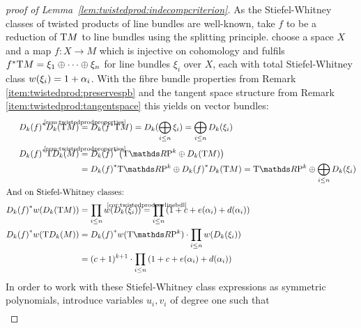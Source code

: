   \begin{proof}[proof of Lemma~\ref{lem:twistedprod:indecompcriterion}]
    As the Stiefel-Whitney classes of twisted products of line bundles
    are well-known, take $f$ to be a reduction of $\mathrm{T}M$ to line bundles
    using the splitting principle.
    \Idest choose a space $X$ and a map $f\colon X\to M$ which is
    injective on cohomology and fulfils
    ${f}^* \mathrm{T}M = \xi_1\oplus\dotsb\oplus\xi_n$ for line bundles
    $\xi_i$ over $X$, each with total Stiefel-Whitney class
    ${w}(\xi_i)=1+\alpha_i$.
    With the fibre bundle properties from
    Remark~%
    \ref{item:twistedprod:preservespb}
    and the tangent space structure from
    Remark~%
    \ref{item:twistedprod:tangentspace}
    this yields on vector bundles:
    \begin{align*}
      \pb{\Twistedprod{k}{f}} \Twistedprod{k}{\T M}
      &\cequalsby{\ref{rem:twistedprodproperties}}
        \Twistedprod{k}{\pb f \T M}
        = \Twistedprod{k}{\bigoplus_{i\leq n}\xi_i}
        = \bigoplus_{i\leq n}\Twistedprod{k}{\xi_i}
      \\
      \pb{\Twistedprod{k}{f}} \T{\Twistedprod{k}{M}}
      &\cequalsby{\ref{rem:twistedprodproperties}}
        \pb{\Twistedprod{k}{f}} \left(
        \T{\RP k} \oplus \Twistedprod{k}{\T M}
        \right)\\
      &= \pb{\Twistedprod{k}{f}} \T{\RP k}
        \oplus
        \pb{\Twistedprod{k}{f}} \Twistedprod{k}{\T M}
        = \T{\RP k} \oplus \bigoplus_{i\leq n}\Twistedprod{k}{\xi_i}\\
      \intertext{And on Stiefel-Whitney classes:}
      \pb{\Twistedprod{k}{f}} \W{\Twistedprod{k}{\T M}}
      &= \prod_{i\leq n} \W{\Twistedprod{k}{\xi_i}}
        \cequalsby{\ref{cor:twistedprod:swlinebdl}}
        \prod_{i\leq n} \left(1 + c + e(\alpha_i) + d(\alpha_i)\right)
      \\
      \pb{\Twistedprod{k}{f}} \W{\T\Twistedprod{k}{M}}
      &= \pb{\Twistedprod{k}{f}}\W{\T{\RP k}}
        \cdot \prod_{i\leq n} \W{\Twistedprod{k}{\xi_i}} \\
      &= (c+1)^{k+1}
        \cdot \prod_{i\leq n} \left(1+c+e(\alpha_i)+d(\alpha_i)\right)
    \end{align*}
    In order to work with these Stiefel-Whitney class expressions as
    symmetric polynomials, introduce variables $u_i, v_i$ of degree
    one such that
    \begin{align*}

\end{align*}
\end{proof}

